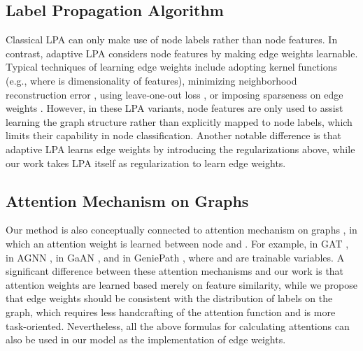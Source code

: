\documentclass{article}
\begin{document}
	\subsection{Label Propagation Algorithm}
		Classical LPA \citep{zhu2005semi,zhou2004learning} can only make use of node labels rather than node features.
		In contrast, adaptive LPA considers node features by making edge weights learnable.
		Typical techniques of learning edge weights include adopting kernel functions \citep{zhu2003semi,liu2018learning} (e.g.,  where  is dimensionality of features), minimizing neighborhood reconstruction error \citep{wang2008label,karasuyama2013manifold}, using leave-one-out loss \citep{zhang2007hyperparameter}, or imposing sparseness on edge weights \citep{hong2009sparsity}.
		However, in these LPA variants, node features are only used to assist learning the graph structure rather than explicitly mapped to node labels, which limits their capability in node classification.
		Another notable difference is that adaptive LPA learns edge weights by introducing the regularizations above, while our work takes LPA itself as regularization to learn edge weights.
	
	\subsection{Attention Mechanism on Graphs}
	Our method is also conceptually connected to attention mechanism on graphs \citep{velivckovic2018graph,thekumparampil2018attention,zhang2018gaan,liu2019geniepath}, in which an attention weight  is learned between node  and .
	For example,  in GAT \citep{velivckovic2018graph},  in AGNN \citep{thekumparampil2018attention},  in GaAN \citep{zhang2018gaan}, and  in GeniePath \citep{liu2019geniepath}, where  and  are trainable variables.
	A significant difference between these attention mechanisms and our work is that attention weights are learned based merely on feature similarity, while we propose that edge weights should be consistent with the distribution of labels on the graph, which requires less handcrafting of the attention function and is more task-oriented.
	Nevertheless, all the above formulas for calculating attentions can also be used in our model as the implementation of edge weights.
	
\end{document}
